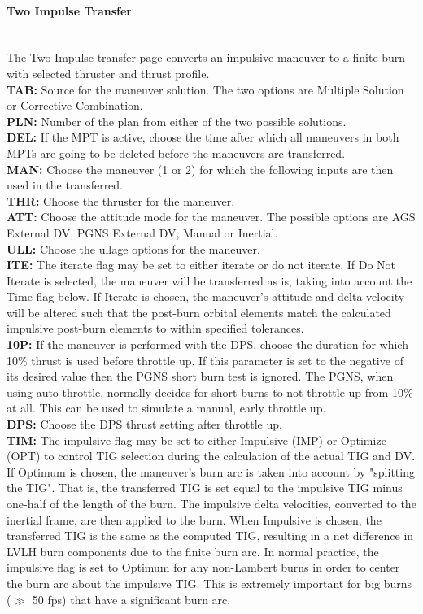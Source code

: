 \documentclass[11pt]{article} %
\begin{document}
\paragraph{Two Impulse Transfer}\mbox{} \\

The Two Impulse transfer page converts an impulsive maneuver to a finite burn with selected thruster and thrust profile.\\

\textbf{TAB:} Source for the maneuver solution. The two options are Multiple Solution or Corrective Combination.\\
\textbf{PLN:} Number of the plan from either of the two possible solutions.\\
\textbf{DEL:} If the MPT is active, choose the time after which all maneuvers in both MPTs are going to be deleted before the maneuvers are transferred.\\
 \textbf{MAN:} Choose the maneuver (1 or 2) for which the following inputs are then used in the transferred.\\
\textbf{THR:} Choose the thruster for the maneuver.\\
\textbf{ATT:} Choose the attitude mode for the maneuver. The possible options are AGS External DV, PGNS External DV, Manual or Inertial.\\
\textbf{ULL:} Choose the ullage options for the maneuver.\\
\textbf{ITE:} The iterate flag may be set to either iterate or do not iterate. If Do Not Iterate is selected, the maneuver will be transferred as is, taking into account the Time flag below. If Iterate is chosen, the maneuver's attitude and delta velocity will be altered such that the post-burn orbital elements match the calculated impulsive post-burn elements to within specified tolerances.\\
\textbf{10P:} If the maneuver is performed with the DPS, choose the duration for which 10\% thrust is used before throttle up. If this parameter is set to the negative of its desired value then the PGNS short burn test is ignored. The PGNS, when using auto throttle, normally decides for short burns to not throttle up from 10\% at all. This can be used to simulate a manual, early throttle up.\\
\textbf{DPS:} Choose the DPS thrust setting after throttle up.\\
\textbf{TIM:} The impulsive flag may be set to either Impulsive (IMP) or Optimize (OPT) to control TIG selection during the calculation of the actual TIG and DV. If Optimum is chosen, the maneuver's burn arc is taken into account by "splitting the TIG". That is, the transferred TIG is set equal to the impulsive TIG minus one-half of the length of the burn. The impulsive delta velocities, converted to the inertial frame, are then applied to the burn. When Impulsive is chosen, the transferred TIG is the same as the computed TIG, resulting in a net difference in LVLH burn components due to the finite burn arc. In normal practice, the impulsive flag is set to Optimum for any non-Lambert burns in order to center the burn arc about the impulsive TIG. This is extremely important for big burns ($\gg$ 50 fps) that have a significant burn arc.\\
\end{document}
